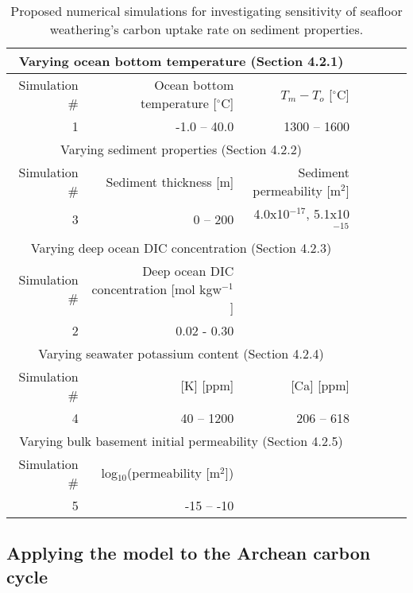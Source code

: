 \documentclass[authoryear,round,12pt]{article}
\begin{document}
\begin{table}[h!]
\caption{Proposed numerical simulations for investigating sensitivity of seafloor weathering's carbon uptake rate on sediment properties.} 
\centering
\begin{tabular}{rrrrrrr} 

\hline \hline
\multicolumn{3}{c}{\cellcolor{grey!25}Varying ocean bottom temperature (Section 4.2.1)}\\
\hline  
Simulation \# & Ocean bottom temperature [$^{\circ}$C] & $T_m - T_o$ [$^{\circ}$C] \\ [0.5ex]   
\hline  
1 & -1.0 -- 40.0 & 1300 -- 1600 \\

\hline \hline
\multicolumn{3}{c}{\cellcolor{grey!25}Varying sediment properties (Section 4.2.2)}\\
\hline  
Simulation \# & Sediment thickness [m] & Sediment permeability [m$^{2}$] \\ [0.5ex]   
\hline  
3  & 0 -- 200 & 4.0x10$^{-17}$, 5.1x10$^{-15}$ \\

\hline \hline
\multicolumn{3}{c}{\cellcolor{grey!25}Varying deep ocean DIC concentration (Section 4.2.3)}\\
\hline  
Simulation \# & Deep ocean DIC concentration [mol kgw$^{-1}$] \\ [0.5ex]   
\hline  
2  & 0.02 - 0.30 \\

\hline \hline
\multicolumn{3}{c}{\cellcolor{grey!25}Varying seawater potassium content (Section 4.2.4)}\\
\hline  
Simulation \# & [K] [ppm] & [Ca] [ppm] \\ [0.5ex]   
\hline  
4 & 40 -- 1200 & 206 -- 618  \\

\hline \hline
\multicolumn{3}{c}{\cellcolor{grey!25}Varying bulk basement initial permeability (Section 4.2.5)}\\
\hline  
Simulation \# & log$_{10}$(permeability [m$^2$])  & \\ [0.5ex]   
\hline  
5 & -15 -- -10&  \\


\hline      
\end{tabular}
\label{tab:exp}
\end{table}


\subsection{Applying the model to the Archean carbon cycle}
\label{sec:paleoclimate}
\end{document}
